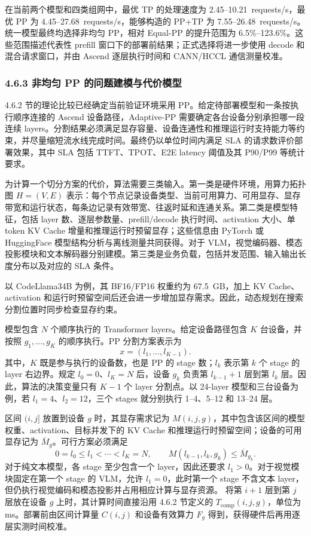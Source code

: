 在当前两个模型和四类组网中，最优 TP 的处理速度为 2.45--10.21~requests/s，最优 PP 为 4.45--27.68~requests/s，能够构造的 PP+TP 为 7.55--26.48~requests/s。统一模型最终均选择非均匀 PP，相对 Equal-PP 的提升范围为 6.5\%--123.6\%。这些范围描述代表性 prefill 窗口下的部署前结果；正式选择将进一步使用 decode 和混合请求窗口，并由 Ascend 逐层执行时间和 CANN/HCCL 通信测量校准。

\subsubsection*{4.6.3 非均匀 PP 的问题建模与代价模型}

4.6.2 节的理论比较已经确定当前验证环境采用 PP。给定待部署模型和一条按执行顺序连接的 Ascend 设备路径，Adaptive-PP 需要确定各台设备分别承担哪一段连续 layers。分割结果必须满足显存容量、设备连通性和推理运行时支持能力等约束，并尽量缩短流水线完成时间。最终仍以单位时间内满足 SLA 的请求数评价部署效果，其中 SLA 包括 TTFT、TPOT、E2E latency 阈值及其 P90/P99 等统计要求。

为计算一个切分方案的代价，算法需要三类输入。第一类是硬件环境，用算力拓扑图 \(H=(V,E)\) 表示：每个节点记录设备类型、当前可用算力、可用显存、显存带宽和运行状态，每条边记录有效带宽、往返时延和连通关系。第二类是模型特征，包括 layer 数、逐层参数量、prefill/decode 执行时间、activation 大小、单 token KV Cache 增量和推理运行时预留显存；这些信息由 PyTorch 或 HuggingFace 模型结构分析与离线测量共同获得。对于 VLM，视觉编码器、模态投影模块和文本解码器分别建模。第三类是业务负载，包括并发范围、输入输出长度分布以及对应的 SLA 条件。

以 CodeLlama34B 为例，其 BF16/FP16 权重约为 67.5~GB，加上 KV Cache、activation 和运行时预留空间后还会进一步增加显存需求。因此，动态规划在搜索分割位置时同步检查显存约束。

模型包含 \(N\) 个顺序执行的 Transformer layers。给定设备路径包含 \(K\) 台设备，并按照 \(g_1,\ldots,g_K\) 的顺序执行。PP 分割方案表示为
\[
x=(l_1,\ldots,l_{K-1}).
\]
其中，\(K\) 既是参与执行的设备数，也是 PP 的 stage 数；\(l_k\) 表示第 \(k\) 个 stage 的 layer 右边界。规定 \(l_0=0\)、\(l_K=N\) 后，设备 \(g_k\) 负责第 \(l_{k-1}+1\) 层到第 \(l_k\) 层。因此，算法的决策变量只有 \(K-1\) 个 layer 分割点。以 24-layer 模型和三台设备为例，若 \(l_1=4\)、\(l_2=12\)，三个 stages 就分别执行 1--4、5--12 和 13--24 层。

区间 \((i,j]\) 放置到设备 \(g\) 时，其显存需求记为 \(M(i,j,g)\)，其中包含该区间的模型权重、activation、目标并发下的 KV Cache 和推理运行时预留空间；设备的可用显存记为 \(\overline M_g\)。可行方案必须满足
\[
0=l_0\leq l_1<\cdots<l_K=N,
\qquad
M(l_{k-1},l_k,g_k)\leq \overline M_{g_k}.
\]
对于纯文本模型，各 stage 至少包含一个 layer，因此还要求 \(l_1>0\)。对于视觉模块固定在第一个 stage 的 VLM，允许 \(l_1=0\)，此时第一个 stage 不含文本 layer，但仍执行视觉编码和模态投影并占用相应计算与显存资源。
将第 \(i+1\) 层到第 \(j\) 层放在设备 \(g\) 上时，其计算时间直接沿用 4.6.2 节定义的 \(T_{\mathrm{comp}}(i,j,g)\)，单位为 ms。部署前由区间计算量 \(C(i,j)\) 和设备有效算力 \(F_g\) 得到，获得硬件后再用逐层实测时间校准。

